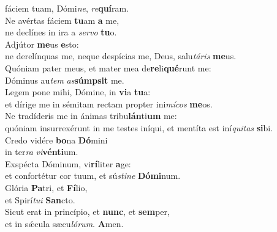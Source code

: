 \oddverse fáciem tuam, Dómi\textit{ne}, \textit{re}\textbf{quí}ram.\\
\evenverse Ne avértas fáciem \textbf{tu}am \textbf{a} me,~\*\\
\evenverse ne declínes in ira a \textit{ser}\textit{vo} \textbf{tu}o.\\
\oddverse Adjútor \textbf{me}us \textbf{e}sto:~\*\\
\oddverse ne derelínquas me, neque despícias me, Deus, salu\textit{tá}\textit{ris} \textbf{me}us.\\
\evenverse Quóniam pater meus, et mater mea de\textbf{re}li\textbf{qué}runt me:~\*\\
\evenverse Dóminus au\textit{tem} \textit{as}\textbf{súm}\textbf{psit} me.\\
\oddverse Legem pone mihi, Dómine, in \textbf{vi}a \textbf{tu}a:~\*\\
\oddverse et dírige me in sémitam rectam propter ini\textit{mí}\textit{cos} \textbf{me}os.\\
\evenverse Ne tradíderis me in ánimas tribu\textbf{lán}ti\textbf{um} me:~\*\\
\evenverse quóniam insurrexérunt in me testes iníqui, et mentíta est iní\textit{qui}\textit{tas} \textbf{si}bi.\\
\oddverse Credo vidére \textbf{bo}na \textbf{Dó}mini~\*\\
\oddverse in ter\textit{ra} \textit{vi}\textbf{vén}\textbf{ti}um.\\
\evenverse Exspécta Dóminum, vi\textbf{rí}liter \textbf{a}ge:~\*\\
\evenverse et confortétur cor tuum, et sú\textit{sti}\textit{ne} \textbf{Dó}\textbf{mi}num.\\
\oddverse Glória \textbf{Pa}tri, et \textbf{Fí}lio,~\*\\
\oddverse et Spirí\textit{tu}\textit{i} \textbf{San}cto.\\
\evenverse Sicut erat in princípio, et \textbf{nunc}, et \textbf{sem}per,~\*\\
\evenverse et in sǽcula sæcu\textit{ló}\textit{rum}. \textbf{A}men.\\
